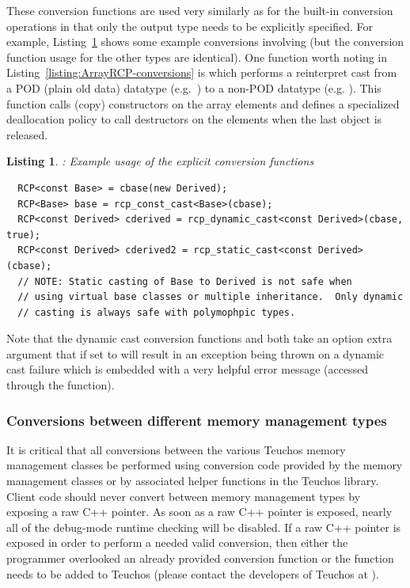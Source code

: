 \documentclass[pdf,ps2pdf,11pt]{SANDreport}
\newtheorem{listing}{Listing}
\begin{document}
These conversion functions are used very similarly as for the built-in
conversion operations in that only the output type needs to be
explicitly specified.  For example,
Listing~\ref{listing:conversions-examples} shows some example
conversions involving {} (but the conversion function usage
for the other types are identical).  One function worth noting in
Listing~\ref{listing:ArrayRCP-conversions} is
{} which performs a
reinterpret cast from a POD (plain old data) datatype (e.g.\
{}) to a non-POD datatype (e.g. {}).
This function calls (copy) constructors on the array elements and
defines a specialized deallocation policy to call destructors on the
elements when the last {}\ttt{ArrayRCP<T2>} object is released.


{}\begin{listing}: Example usage of the explicit conversion functions
\label{listing:conversions-examples}
{\small\begin{verbatim}
  RCP<const Base> = cbase(new Derived);
  RCP<Base> base = rcp_const_cast<Base>(cbase);
  RCP<const Derived> cderived = rcp_dynamic_cast<const Derived>(cbase, true);
  RCP<const Derived> cderived2 = rcp_static_cast<const Derived>(cbase);
  // NOTE: Static casting of Base to Derived is not safe when
  // using virtual base classes or multiple inheritance.  Only dynamic
  // casting is always safe with polymophpic types.
\end{verbatim}}
\end{listing}


Note that the dynamic cast conversion functions
{} and {} both
take an option extra argument {}\ttt{throw\_on\_fail} that if set to
{}\ttt{true} will result in an exception being thrown on a dynamic
cast failure which is embedded with a very helpful error message
(accessed through the {}\ttt{std::exception::what()} function).


%
{}\subsubsection{Conversions between different memory management types}
\label{sec:teuchos-type-conversions}
%

It is critical that all conversions between the various Teuchos memory
management classes be performed using conversion code provided by the
memory management classes or by associated helper functions in the
Teuchos library.  Client code should never convert between memory
management types by exposing a raw C++ pointer.  As soon as a raw C++
pointer is exposed, nearly all of the debug-mode runtime checking will
be disabled.  If a raw C++ pointer is exposed in order to perform a
needed valid conversion, then either the programmer overlooked an
already provided conversion function or the function needs to be added
to Teuchos (please contact the developers of Teuchos at
{}).
\end{document}
